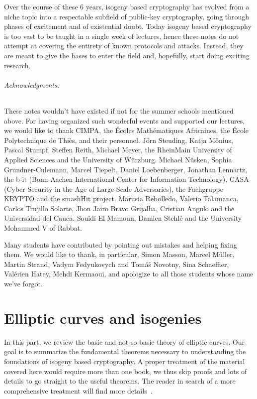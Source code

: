 \documentclass[10pt]{article}
\theoremstyle{plain}
\theoremstyle{definition}
\begin{document}
Over the course of these 6 years, isogeny based cryptography has
evolved from a niche topic into a respectable subfield of public-key
cryptography, going through phases of excitement and of existential
doubt. %
Today isogeny based cryptography is too vast to be taught in a single
week of lectures, hence these notes do not attempt at covering the
entirety of known protocols and attacks. %
Instead, they are meant to give the bases to enter the field and,
hopefully, start doing exciting research.

\paragraph{Acknowledgments.}
These notes wouldn't have existed if not for the summer schools
mentioned above. %
For having organized such wonderful events and supported our lectures,
we would like to thank CIMPA, the Écoles Mathématiques Africaines, the
École Polytechnique de Thiès, and their personnel. %
Jörn Steuding, Katja Mönius, Pascal Stumpf, Steffen Reith, Michael
Meyer, the RheinMain University of Applied Sciences and the University
of Würzburg. %
Michael Nüsken, Sophia Grundner-Culemann, Marcel Tiepelt, Daniel
Loebenberger, Jonathan Lennartz, the b-it (Bonn-Aachen International
Center for Information Technology), CASA (Cyber Security in the Age of
Large-Scale Adversaries), the Fachgruppe KRYPTO and the smashHit
project. %
Marusia Rebolledo, Valerio Talamanca, Carlos Trujillo Solarte, Jhon
Jairo Bravo Grijalba, Cristian Angulo and the Universidad del Cauca. %
Souidi El Mamoun, Damien Stehlé and the University Mohammed V of
Rabbat.

Many students have contributed by pointing out mistakes and helping
fixing them. %
We would like to thank, in particular, Simon Masson, Marcel Müller,
Martin Strand, Vadym Fedyukovych and Tomáš Novotny, Sina Schaeffler,
Val\'erien Hatey, Mehdi Kermaoui, and apologize to all those students
whose name we've forgot.

\clearpage
{
  \hypersetup{linkcolor=black}
  \setcounter{tocdepth}{1}
  \tableofcontents
}


\clearpage
\part{Elliptic curves and isogenies}

In this part, we review the basic and not-so-basic theory of elliptic
curves. %
Our goal is to summarize the fundamental theorems necessary to
understanding the foundations of isogeny based cryptography. %
A proper treatment of the material covered here would require more
than one book, we thus skip proofs and lots of details to go straight
to the useful theorems. %
The reader in search of a more comprehensive treatment will find more
details~\cite{silverman:elliptic,silverman:advanced,lang1987elliptic,neukirch2013algebraic}. %
\end{document}
